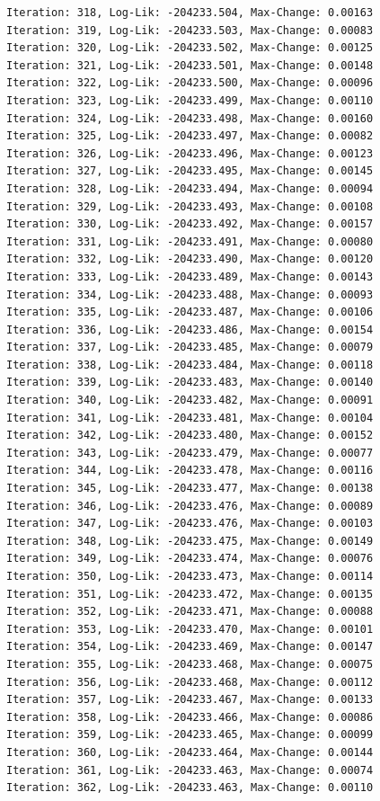 \documentclass[
  letterpaper,
  DIV=11,
  numbers=noendperiod]{scrreport}
\begin{document}
\begin{verbatim}
Iteration: 318, Log-Lik: -204233.504, Max-Change: 0.00163
Iteration: 319, Log-Lik: -204233.503, Max-Change: 0.00083
Iteration: 320, Log-Lik: -204233.502, Max-Change: 0.00125
Iteration: 321, Log-Lik: -204233.501, Max-Change: 0.00148
Iteration: 322, Log-Lik: -204233.500, Max-Change: 0.00096
Iteration: 323, Log-Lik: -204233.499, Max-Change: 0.00110
Iteration: 324, Log-Lik: -204233.498, Max-Change: 0.00160
Iteration: 325, Log-Lik: -204233.497, Max-Change: 0.00082
Iteration: 326, Log-Lik: -204233.496, Max-Change: 0.00123
Iteration: 327, Log-Lik: -204233.495, Max-Change: 0.00145
Iteration: 328, Log-Lik: -204233.494, Max-Change: 0.00094
Iteration: 329, Log-Lik: -204233.493, Max-Change: 0.00108
Iteration: 330, Log-Lik: -204233.492, Max-Change: 0.00157
Iteration: 331, Log-Lik: -204233.491, Max-Change: 0.00080
Iteration: 332, Log-Lik: -204233.490, Max-Change: 0.00120
Iteration: 333, Log-Lik: -204233.489, Max-Change: 0.00143
Iteration: 334, Log-Lik: -204233.488, Max-Change: 0.00093
Iteration: 335, Log-Lik: -204233.487, Max-Change: 0.00106
Iteration: 336, Log-Lik: -204233.486, Max-Change: 0.00154
Iteration: 337, Log-Lik: -204233.485, Max-Change: 0.00079
Iteration: 338, Log-Lik: -204233.484, Max-Change: 0.00118
Iteration: 339, Log-Lik: -204233.483, Max-Change: 0.00140
Iteration: 340, Log-Lik: -204233.482, Max-Change: 0.00091
Iteration: 341, Log-Lik: -204233.481, Max-Change: 0.00104
Iteration: 342, Log-Lik: -204233.480, Max-Change: 0.00152
Iteration: 343, Log-Lik: -204233.479, Max-Change: 0.00077
Iteration: 344, Log-Lik: -204233.478, Max-Change: 0.00116
Iteration: 345, Log-Lik: -204233.477, Max-Change: 0.00138
Iteration: 346, Log-Lik: -204233.476, Max-Change: 0.00089
Iteration: 347, Log-Lik: -204233.476, Max-Change: 0.00103
Iteration: 348, Log-Lik: -204233.475, Max-Change: 0.00149
Iteration: 349, Log-Lik: -204233.474, Max-Change: 0.00076
Iteration: 350, Log-Lik: -204233.473, Max-Change: 0.00114
Iteration: 351, Log-Lik: -204233.472, Max-Change: 0.00135
Iteration: 352, Log-Lik: -204233.471, Max-Change: 0.00088
Iteration: 353, Log-Lik: -204233.470, Max-Change: 0.00101
Iteration: 354, Log-Lik: -204233.469, Max-Change: 0.00147
Iteration: 355, Log-Lik: -204233.468, Max-Change: 0.00075
Iteration: 356, Log-Lik: -204233.468, Max-Change: 0.00112
Iteration: 357, Log-Lik: -204233.467, Max-Change: 0.00133
Iteration: 358, Log-Lik: -204233.466, Max-Change: 0.00086
Iteration: 359, Log-Lik: -204233.465, Max-Change: 0.00099
Iteration: 360, Log-Lik: -204233.464, Max-Change: 0.00144
Iteration: 361, Log-Lik: -204233.463, Max-Change: 0.00074
Iteration: 362, Log-Lik: -204233.463, Max-Change: 0.00110

\end{verbatim}
\end{document}
